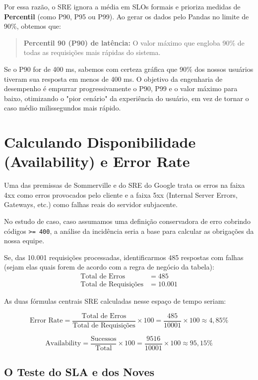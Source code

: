 \documentclass[12pt,a4paper]{report}
\begin{document}
Por essa razão, o SRE ignora a média em SLOs formais e prioriza medidas de \textbf{Percentil} (como P90, P95 ou P99). Ao gerar os dados pelo Pandas no limite de 90\%, obtemos que:
\begin{quote}
    \textbf{Percentil 90 (P90) de latência:} O valor máximo que engloba 90\% de todas as requisições mais rápidas do sistema.
\end{quote}

Se o P90 for de 400 ms, sabemos com certeza gráfica que 90\% dos nossos usuários tiveram sua resposta em menos de 400 ms. O objetivo da engenharia de desempenho é empurrar progressivamente o P90, P99 e o valor máximo para baixo, otimizando o "pior cenário" da experiência do usuário, em vez de tornar o caso médio milissegundos mais rápido.

\section{Calculando Disponibilidade (Availability) e Error Rate}

Uma das premissas de Sommerville e do SRE do Google trata os erros na faixa 4xx como erros provocados pelo cliente e a faixa 5xx (Internal Server Errors, Gateways, etc.) como falhas reais do servidor subjacente.

No estudo de caso, caso assumamos uma definição conservadora de erro cobrindo códigos \texttt{>= 400}, a análise da incidência seria a base para calcular as obrigações da nossa equipe.

Se, das 10.001 requisições processadas, identificarmos 485 respostas com falhas (sejam elas quais forem de acordo com a regra de negócio da tabela):
\begin{align*}
\text{Total de Erros} &= 485 \\
\text{Total de Requisições} &= 10.001
\end{align*}

As duas fórmulas centrais SRE calculadas nesse espaço de tempo seriam:

\[ \text{Error Rate} = \frac{\text{Total de Erros}}{\text{Total de Requisições}} \times 100 = \frac{485}{10001} \times 100 \approx 4,85\% \]

\[ \text{Availability} = \frac{\text{Sucessos}}{\text{Total}} \times 100 = \frac{9516}{10001} \times 100 \approx 95,15\% \]

\subsection{O Teste do SLA e dos Noves}
\end{document}
